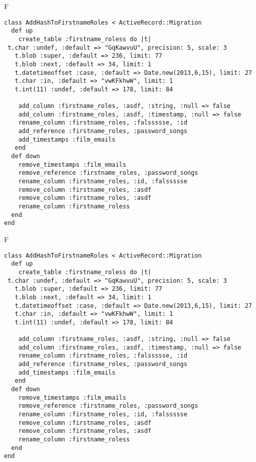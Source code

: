 F
\begin{verbatim}
class AddHashToFirstnameRoles < ActiveRecord::Migration
  def up
    create_table :firstname_roless do |t| 
 t.char :undef, :default => "GqKawvuU", precision: 5, scale: 3
   t.blob :super, :default => 236, limit: 77
   t.blob :next, :default => 34, limit: 1
   t.datetimeoffset :case, :default => Date.new(2013,6,15), limit: 27
   t.char :in, :default => "vwKFkhwW", limit: 1
   t.int(11) :undef, :default => 178, limit: 84

    add_column :firstname_roles, :asdf, :string, :null => false
    add_column :firstname_roles, :asdf, :timestamp, :null => false
    rename_column :firstname_roles, :falssssse, :id
    add_reference :firstname_roles, :password_songs
    add_timestamps :film_emails
   end
  def down
    remove_timestamps :film_emails
    remove_reference :firstname_roles, :password_songs
    rename_column :firstname_roles, :id, :falssssse
    remove_column :firstname_roles, :asdf
    remove_column :firstname_roles, :asdf
    rename_column :firstname_roless
  end
end
\end{verbatim}

F
\begin{verbatim}
class AddHashToFirstnameRoles < ActiveRecord::Migration
  def up
    create_table :firstname_roless do |t| 
 t.char :undef, :default => "GqKawvuU", precision: 5, scale: 3
   t.blob :super, :default => 236, limit: 77
   t.blob :next, :default => 34, limit: 1
   t.datetimeoffset :case, :default => Date.new(2013,6,15), limit: 27
   t.char :in, :default => "vwKFkhwW", limit: 1
   t.int(11) :undef, :default => 178, limit: 84

    add_column :firstname_roles, :asdf, :string, :null => false
    add_column :firstname_roles, :asdf, :timestamp, :null => false
    rename_column :firstname_roles, :falssssse, :id
    add_reference :firstname_roles, :password_songs
    add_timestamps :film_emails
   end
  def down
    remove_timestamps :film_emails
    remove_reference :firstname_roles, :password_songs
    rename_column :firstname_roles, :id, :falssssse
    remove_column :firstname_roles, :asdf
    remove_column :firstname_roles, :asdf
    rename_column :firstname_roless
  end
end
\end{verbatim}

